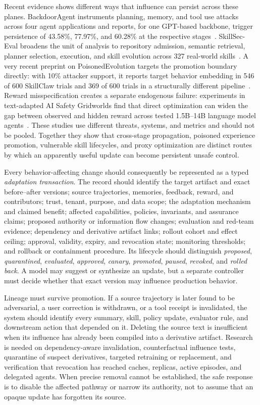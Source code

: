 Recent evidence shows different ways that influence can persist across these planes. BackdoorAgent instruments planning, memory, and tool use attacks across four agent applications and reports, for one GPT-based backbone, trigger persistence of 43.58\%, 77.97\%, and 60.28\% at the respective stages~\cite{feng2026backdooragent}. SkillSec-Eval broadens the unit of analysis to repository admission, semantic retrieval, planner selection, execution, and skill evolution across 327 real-world skills~\cite{badhe2026skillsec}. A very recent preprint on PoisonedEvolution targets the promotion boundary directly: with 10\% attacker support, it reports target behavior embedding in 546 of 600 SkillClaw trials and 369 of 600 trials in a structurally different pipeline~\cite{chen2026poisonedevolution}. Reward misspecification creates a separate endogenous failure: experiments in text-adapted AI Safety Gridworlds find that direct optimization can widen the gap between observed and hidden reward across tested 1.5B--14B language model agents~\cite{cagatan2026rewardhacking}. These studies use different threats, systems, and metrics and should not be pooled. Together they show that cross-stage propagation, poisoned experience promotion, vulnerable skill lifecycles, and proxy optimization are distinct routes by which an apparently useful update can become persistent unsafe control.

Every behavior-affecting change should consequently be represented as a typed \emph{adaptation transaction}. The record should identify the target artifact and exact before--after versions; source trajectories, memories, feedback, reward, and contributors; trust, tenant, purpose, and data scope; the adaptation mechanism and claimed benefit; affected capabilities, policies, invariants, and assurance claims; proposed authority or information flow changes; evaluation and red-team evidence; dependency and derivative artifact links; rollout cohort and effect ceiling; approval, validity, expiry, and revocation state; monitoring thresholds; and rollback or containment procedure. Its lifecycle should distinguish \emph{proposed}, \emph{quarantined}, \emph{evaluated}, \emph{approved}, \emph{canary}, \emph{promoted}, \emph{paused}, \emph{revoked}, and \emph{rolled back}. A model may suggest or synthesize an update, but a separate controller must decide whether that exact version may influence production behavior.

Lineage must survive promotion. If a source trajectory is later found to be adversarial, a user correction is withdrawn, or a tool receipt is invalidated, the system should identify every summary, skill, policy update, evaluator rule, and downstream action that depended on it. Deleting the source text is insufficient when its influence has already been compiled into a derivative artifact. Research is needed on dependency-aware invalidation, counterfactual influence tests, quarantine of suspect derivatives, targeted retraining or replacement, and verification that revocation has reached caches, replicas, active episodes, and delegated agents. When precise removal cannot be established, the safe response is to disable the affected pathway or narrow its authority, not to assume that an opaque update has forgotten its source.

